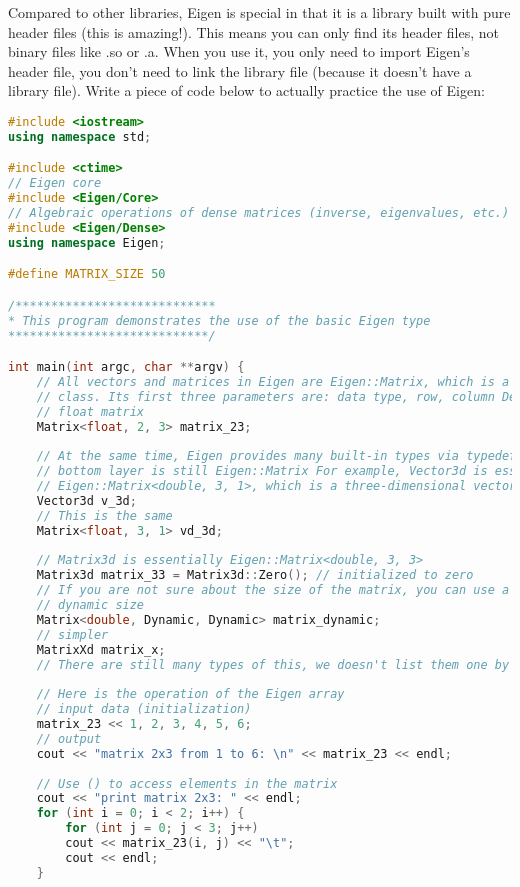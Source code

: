 Compared to other libraries, Eigen is special in that it is a library built with pure header files (this is amazing!). This means you can only find its header files, not binary files like .so or .a. When you use it, you only need to import Eigen's header file, you don't need to link the library file (because it doesn't have a library file). Write a piece of code below to actually practice the use of Eigen:
\begin{lstlisting}[language=c++,caption=slambook2/ch3/useEigen/eigenMatrix.cpp]
#include <iostream>
using namespace std;

#include <ctime>
// Eigen core
#include <Eigen/Core>
// Algebraic operations of dense matrices (inverse, eigenvalues, etc.)
#include <Eigen/Dense>
using namespace Eigen;

#define MATRIX_SIZE 50

/****************************
* This program demonstrates the use of the basic Eigen type
****************************/

int main(int argc, char **argv) {
    // All vectors and matrices in Eigen are Eigen::Matrix, which is a template
    // class. Its first three parameters are: data type, row, column Declare a 2*3
    // float matrix
    Matrix<float, 2, 3> matrix_23;
    
    // At the same time, Eigen provides many built-in types via typedef, but the
    // bottom layer is still Eigen::Matrix For example, Vector3d is essentially
    // Eigen::Matrix<double, 3, 1>, which is a three-dimensional vector.
    Vector3d v_3d;
    // This is the same
    Matrix<float, 3, 1> vd_3d;
    
    // Matrix3d is essentially Eigen::Matrix<double, 3, 3>
    Matrix3d matrix_33 = Matrix3d::Zero(); // initialized to zero
    // If you are not sure about the size of the matrix, you can use a matrix of
    // dynamic size
    Matrix<double, Dynamic, Dynamic> matrix_dynamic;
    // simpler
    MatrixXd matrix_x;
    // There are still many types of this, we doesn't list them one by one.
    
    // Here is the operation of the Eigen array
    // input data (initialization)
    matrix_23 << 1, 2, 3, 4, 5, 6;
    // output
    cout << "matrix 2x3 from 1 to 6: \n" << matrix_23 << endl;
    
    // Use () to access elements in the matrix
    cout << "print matrix 2x3: " << endl;
    for (int i = 0; i < 2; i++) {
        for (int j = 0; j < 3; j++)
        cout << matrix_23(i, j) << "\t";
        cout << endl;
    }
    

\end{lstlisting}
